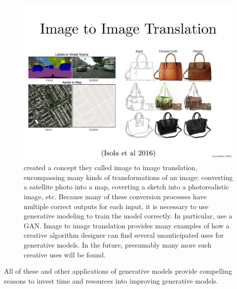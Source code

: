 \begin{figure}
  \centering
  \includegraphics[width=\textwidth]{im2im}
  \caption{
    \citet{isola2016image}
    created a concept they called {image to image translation},
    encompassing many kinds of transformations of an image:
    converting a satellite photo into a map,
    coverting a sketch into a photorealistic image,
    etc.
    Because many of these conversion processes have multiple
    correct outputs for each input, it is necessary to use
    generative modeling to train the model correctly.
    In particular, \citet{isola2016image} use a GAN.
    Image to image translation provides many examples of how
    a creative algorithm designer can find several unanticipated uses
    for generative models.
    In the future, presumably many more such creative uses
    will be found.
  }
  \label{fig:im2im}
\end{figure}

All of these and other applications of generative models provide compelling
reasons to invest time and resources into improving generative models.

